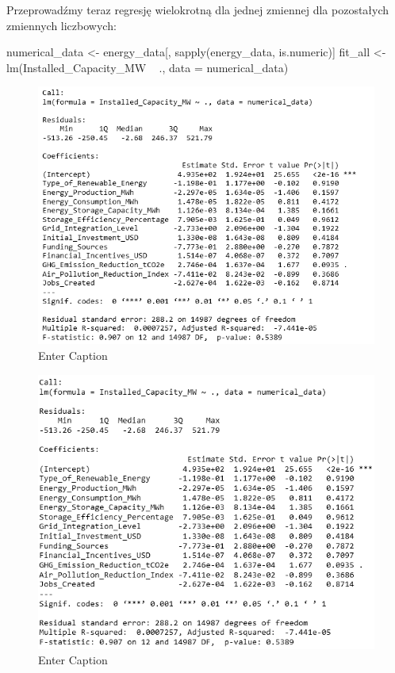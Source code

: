 Przeprowadźmy teraz regresję wielokrotną dla jednej zmiennej dla pozostałych zmiennych liczbowych:

\begin{Rcode}
numerical_data <- energy_data[, sapply(energy_data, is.numeric)]
fit_all <- lm(Installed_Capacity_MW ~ ., data = numerical_data)
\end{Rcode}

\begin{figure}[H]
    \centering
    \includegraphics[width=1\linewidth]{lab1/obraz10.png}
    \caption{Enter Caption}
    \label{fig:enter-label}
\end{figure}

\begin{figure}[H]
    \centering
    \includegraphics[width=1\linewidth]{lab1/obraz11.png}
    \caption{Enter Caption}
    \label{fig:enter-label}
\end{figure}

